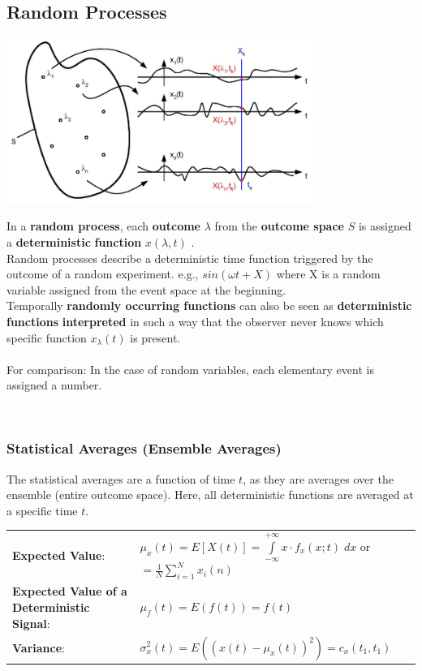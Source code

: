 		\subsection{Random Processes}
		\begin{minipage}{10.3cm}
			\includegraphics[width=10cm]{bilder/zufallsprozess.png}
		\end{minipage}
		\begin{minipage}{8.5cm}
			In a \textbf{random process}, each \textbf{outcome} \boldmath$\lambda$ from 
			the \textbf{outcome space} $S$ is assigned a \textbf{deterministic} \textbf{function} $x(\lambda, t)$
			\unboldmath. \\
			Random processes describe a deterministic time function triggered by the outcome of
			a random experiment. e.g., $sin(\omega t + X)$ where X is a random variable assigned from the event space at the beginning.\\
			Temporally \textbf{randomly occurring functions} can also be seen as \textbf{deterministic functions} 
			\textbf{interpreted} in such a way that the observer never knows which specific function $x_\lambda(t)$
			is present.  \\ \\
			For comparison: In the case of random variables, each elementary event is assigned a number. 
		\end{minipage} 
		\vspace{0.5cm} \\

		\subsubsection{Statistical Averages (Ensemble Averages)}
		The statistical averages are a function of time $t$, as they are averages over the
		ensemble (entire outcome space). Here, all deterministic functions are averaged at a
		specific time $t$.

		\renewcommand{\arraystretch}{1.4}
		\begin{tabular}[c]{ p{4.5cm}  p{13.5 cm}  }
			\textbf{Expected Value}:   &  $\mu_{x}(t) = E\left[X(t)\right] =
				  \int\limits_{-\infty}^{+\infty} x \cdot f_{x}(x;t)\;dx$ or $=\frac{1}{N}\sum\limits_{i=1}^{N}x_i(n)$ \\
			\textbf{Expected Value of a Deterministic Signal}:& $\mu_f(t) = E(f(t))=f(t)$\\
			\textbf{Variance}: &         $\sigma_x^2(t)=E((x(t)-\mu_x(t))^2)=c_x(t_1,t_1)$
		\end{tabular}
		\renewcommand{\arraystretch}{1}


